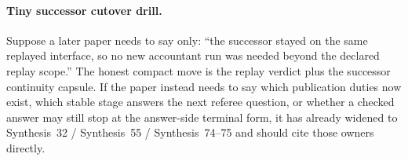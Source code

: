 \documentclass[11pt]{article}
\begin{document}
\paragraph{Tiny successor cutover drill.}
Suppose a later paper needs to say only: ``the successor stayed on the same replayed interface, so no new accountant run was needed beyond the declared replay scope.'' The honest compact move is the replay verdict plus the successor continuity capsule. If the paper instead needs to say which publication duties now exist, which stable stage answers the next referee question, or whether a checked answer may still stop at the answer-side terminal form, it has already widened to Synthesis~32 / Synthesis~55 / Synthesis~74--75 and should cite those owners directly.\cite{series:releasespine,series:seriesspines,series:pairedterminalcitationdiscipline,series:pairedterminalcutoverrules}
\end{document}
